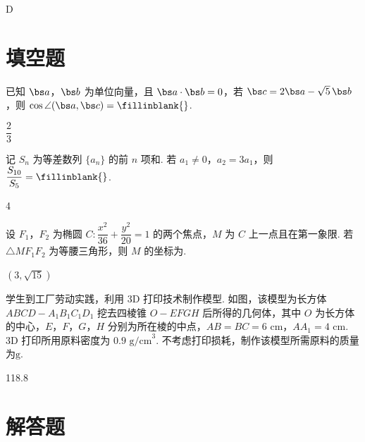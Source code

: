 \begin{answer}
D
\end{answer}

\section{填空题}

\begin{problem}
已知 \(\bs a\)，\(\bs b\) 为单位向量，且 \(\bs a\cdot\bs b=0\)，若 \(\bs c=2\bs a-\sqrt5\,\bs b\)，则 \(\cos\angle(\bs a,\bs c)=\fillinblank{}\).
\end{problem}

\begin{answer}
\(\dfrac{2}{3}\)
\end{answer}

\begin{problem}
记 \(S_n\) 为等差数列 \(\{a_n\}\) 的前 \(n\) 项和. 若 \(a_1\ne0\)，\(a_2=3a_1\)，则 \(\dfrac{S_{10}}{S_5}=\fillinblank{}\).
\end{problem}

\begin{answer}
4
\end{answer}

\begin{problem}
设 \(F_1\)，\(F_2\) 为椭圆 \(C:\dfrac{x^2}{36}+\dfrac{y^2}{20}=1\) 的两个焦点，\(M\) 为 \(C\) 上一点且在第一象限. 若 \(\triangle MF_1F_2\) 为等腰三角形，则 \(M\) 的坐标为\fillinblank{}.
\end{problem}

\begin{answer}
\((3,\sqrt{15})\)
\end{answer}

\begin{problem}
学生到工厂劳动实践，利用 \(3\mathrm{D}\) 打印技术制作模型. 如图，该模型为长方体 \(ABCD-A_1B_1C_1D_1\) 挖去四棱锥 \(O-EFGH\) 后所得的几何体，其中 \(O\) 为长方体的中心，\(E\)，\(F\)，\(G\)，\(H\) 分别为所在棱的中点，\(AB=BC=6\text{ cm}\)，\(AA_1=4\text{ cm}\). \(3\mathrm{D}\) 打印所用原料密度为 \(0.9\text{ g/cm}^3\). 不考虑打印损耗，制作该模型所需原料的质量为\fillinblank{}\(\mathrm{g}\).

\end{problem}

\begin{answer}
118.8
\end{answer}

\section{解答题}

